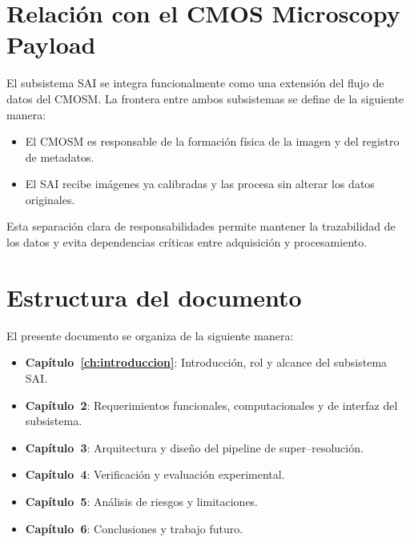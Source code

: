 \section{Relación con el CMOS Microscopy Payload}

El subsistema SAI se integra funcionalmente como una extensión del flujo de datos
del CMOSM. La frontera entre ambos subsistemas se define de la siguiente manera:

\begin{itemize}
    \item El CMOSM es responsable de la formación física de la imagen y del
    registro de metadatos.
    \item El SAI recibe imágenes ya calibradas y las procesa sin alterar los
    datos originales.
\end{itemize}

Esta separación clara de responsabilidades permite mantener la trazabilidad de
los datos y evita dependencias críticas entre adquisición y procesamiento.

\section{Estructura del documento}

El presente documento se organiza de la siguiente manera:

\begin{itemize}
    \item \textbf{Capítulo~\ref{ch:introduccion}}: Introducción, rol y alcance del
    subsistema SAI.
    \item \textbf{Capítulo~2}: Requerimientos funcionales, computacionales y de
    interfaz del subsistema.
    \item \textbf{Capítulo~3}: Arquitectura y diseño del pipeline de
    super--resolución.
    \item \textbf{Capítulo~4}: Verificación y evaluación experimental.
    \item \textbf{Capítulo~5}: Análisis de riesgos y limitaciones.
    \item \textbf{Capítulo~6}: Conclusiones y trabajo futuro.
\end{itemize}
